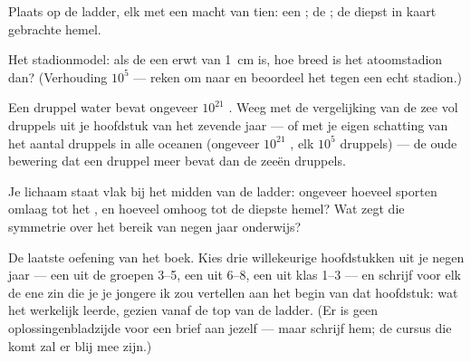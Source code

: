 \begin{exercise}[$\star$]\label{exo:g9:atoms-to-galaxies:8}
Plaats op de ladder, elk met een macht van tien: een
; de ; de diepst in kaart gebrachte
hemel.
\end{exercise}

\begin{exercise}[$\star\star$]\label{exo:g9:atoms-to-galaxies:9}
Het stadionmodel: als de  een erwt van \qty{1}{cm} is, hoe
breed is het atoomstadion dan? (Verhouding $10^{5}$ --- reken om naar
 en beoordeel het tegen een echt stadion.)
\end{exercise}

\begin{exercise}[$\star\star$]\label{exo:g9:atoms-to-galaxies:10}
Een druppel water bevat ongeveer $10^{21}$ . Weeg met
de vergelijking van de zee vol druppels uit je hoofdstuk van het zevende
jaar --- of met je eigen schatting van het aantal druppels in alle
oceanen (ongeveer $10^{21}$ , elk $10^{5}$ druppels) --- de
oude bewering dat een druppel meer  bevat dan de zeeën
druppels.
\end{exercise}

\begin{exercise}[$\star\star$]\label{exo:g9:atoms-to-galaxies:11}
Je lichaam staat vlak bij het midden van de ladder: ongeveer hoeveel
sporten omlaag tot het , en hoeveel omhoog tot de diepste
hemel? Wat zegt die symmetrie over het bereik van negen jaar onderwijs?
\end{exercise}

\begin{exercise}[$\star\star\star$]\label{exo:g9:atoms-to-galaxies:12}
De laatste oefening van het boek. Kies drie willekeurige hoofdstukken
uit je negen jaar --- een uit de groepen 3--5, een uit 6--8, een uit
klas 1--3 --- en schrijf voor elk de ene zin die je je jongere ik zou
vertellen aan het begin van dat hoofdstuk: wat het werkelijk leerde,
gezien vanaf de top van de ladder. (Er is geen oplossingenbladzijde
voor een brief aan jezelf --- maar schrijf hem; de cursus die komt zal
er blij mee zijn.)
\end{exercise}

